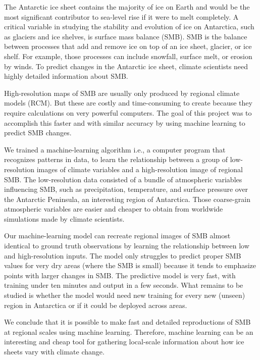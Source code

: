 \documentclass[a4paper,11pt,oneside]{report}
\begin{document}
\begin{plainlanguage}

The Antarctic ice sheet contains the majority of ice on Earth and would be the most significant contributor to sea-level rise if it were to melt completely. A critical variable in studying the stability and evolution of ice on Antarctica, such as glaciers and ice shelves, is surface mass balance (SMB). SMB is the balance between processes that add and remove ice on top of an ice sheet, glacier, or ice shelf. For example, those processes can include snowfall, surface melt, or erosion by winds. To predict changes in the Antarctic ice sheet, climate scientists need highly detailed information about SMB. 

High-resolution maps of SMB are usually only produced by regional climate models (RCM). But these are costly and time-consuming to create because they require calculations on very powerful computers. The goal of this project was to accomplish this faster and with similar accuracy by using machine learning to predict SMB changes. 

We trained a machine-learning algorithm i.e., a computer program that recognizes patterns in data, to learn the relationship between a group of low-resolution images of climate variables and a high-resolution image of regional SMB. The low-resolution data consisted of a bundle of atmospheric variables influencing SMB, such as precipitation, temperature, and surface pressure over the Antarctic Peninsula, an interesting region of Antarctica. Those coarse-grain atmospheric variables are easier and cheaper to obtain from worldwide simulations made by climate scientists. 

Our machine-learning model can recreate regional images of SMB almost identical to ground truth observations by learning the relationship between low and high-resolution inputs. The model only struggles to predict proper SMB values for very dry areas (where the SMB is small) because it tends to emphasize points with larger changes in SMB. The predictive model is very fast, with training under ten minutes and output in a few seconds. What remains to be studied is whether the model would need new training for every new (unseen) region in Antarctica or if it could be deployed across areas.

We conclude that it is possible to make fast and detailed reproductions of SMB at regional scales using machine learning. Therefore, machine learning can be an interesting and cheap tool for gathering local-scale information about how ice sheets vary with climate change.  


\end{plainlanguage}
\end{document}

